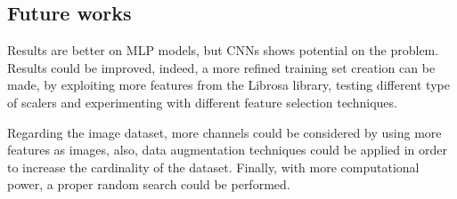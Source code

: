 \subsection{Future works}

Results are better on MLP models, but CNNs
shows potential on the problem.
Results could be improved, indeed, 
a more refined training set creation can be made, by exploiting 
more features from the Librosa library, testing different type 
of scalers and experimenting with different feature selection 
techniques.

Regarding the image dataset, more channels could be considered 
by using more features as images, also, data augmentation techniques 
could be applied in order to increase the cardinality of the dataset.
Finally, with more computational power, a proper random search could be performed.